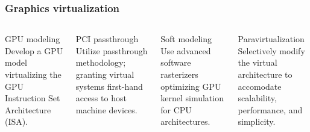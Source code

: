 
\begin{frame}
\frametitle{Graphics virtualization}

\begin{columns}
	\begin{block}{GPU modeling}
		Develop a GPU model virtualizing the GPU Instruction Set Architecture (ISA).
	\end{block}
	\begin{block}{PCI passthrough}
		Utilize passthrough methodology; granting virtual systems first-hand access to host machine devices.
	\end{block}
    \begin{block}{Soft modeling}
    	Use advanced software rasterizers optimizing GPU kernel simulation for CPU architectures.
    \end{block}
    \begin{block}{Paravirtualization}
    	Selectively modify the virtual architecture to accomodate scalability, performance, and simplicity.
    \end{block}
\end{columns}
	
\end{frame}